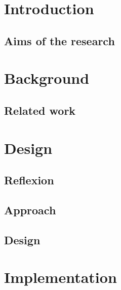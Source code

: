 \documentclass[a4paper,13pt]{article}
\begin{document}


\newpage{}
\renewcommand{\contentsname}{Abstract}

\renewcommand{\contentsname}{Table of contents}
\tableofcontents

\newpage{}

\section{Introduction}

    \subsection{Aims of the research}
    

\section{Background}

    
    \subsection{Related work}
    


\clearpage
\section{Design}


    \subsection{Reflexion}
    
    
    \subsection{Approach}
    
    
    \subsection{Design}
    
    
\section{Implementation}

\end{document}
